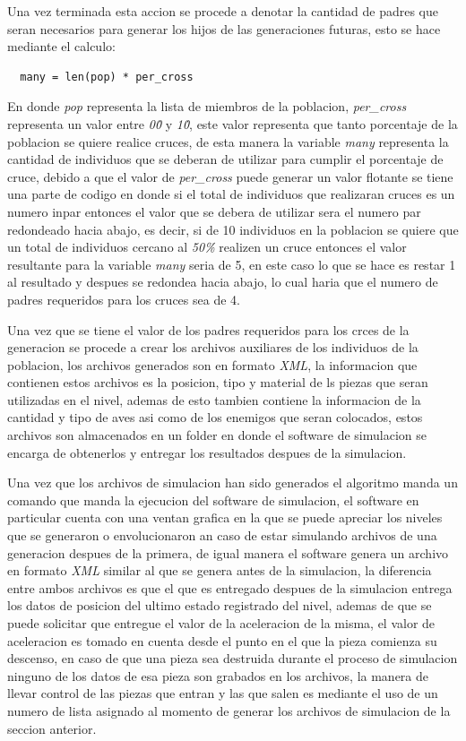 Una vez terminada esta accion se procede a denotar la cantidad de padres que
seran necesarios para generar los hijos de las generaciones futuras, esto se
hace mediante el calculo:
\begin{verbatim}
  many = len(pop) * per_cross
\end{verbatim}
En donde \textit{pop} representa la lista de miembros de la poblacion,
\textit{per\_cross} representa un valor entre \textit{0\.0} y \textit{1\.0}, este
valor representa que tanto porcentaje de la poblacion se quiere realice cruces,
de esta manera la variable \textit{many} representa la cantidad de individuos
que se deberan de utilizar para cumplir el porcentaje de cruce, debido a que el
valor de \textit{per\_cross} puede generar un valor flotante se tiene una parte
de codigo en donde si el total de individuos que realizaran cruces es un numero
inpar entonces el valor que se debera de utilizar sera el numero par redondeado
hacia abajo, es decir, si de 10 individuos en la poblacion se quiere que un
total de individuos cercano al \textit{50\%} realizen un cruce entonces el valor
resultante para la variable \textit{many} seria de 5, en este caso lo que se
hace es restar 1 al resultado y despues se redondea hacia abajo, lo cual haria
que el numero de padres requeridos para los cruces sea de 4.

Una vez que se tiene el valor de los padres requeridos para los crces de la
generacion se procede a crear los archivos auxiliares de los individuos de la
poblacion, los archivos generados son en formato \textit{XML}, la informacion
que contienen estos archivos es la posicion, tipo y material de ls piezas que
seran utilizadas en el nivel, ademas de esto tambien contiene la informacion de
la cantidad y tipo de aves asi como de los enemigos que seran colocados, estos
archivos son almacenados en un folder en donde el software de simulacion se
encarga de obtenerlos y entregar los resultados despues de la simulacion.

Una vez que los archivos de simulacion han sido generados el algoritmo manda un
comando que manda la ejecucion del software de simulacion, el software en
particular cuenta con una ventan grafica en la que se puede apreciar los niveles
que se generaron o envolucionaron an caso de estar simulando archivos de una
generacion despues de la primera, de igual manera el software genera un archivo
en formato \textit{XML} similar al que se genera antes de la simulacion, la
diferencia entre ambos archivos es que el que es entregado despues de la
simulacion entrega los datos de posicion del ultimo estado registrado del nivel,
ademas de que se puede solicitar que entregue el valor de la aceleracion de la
misma, el valor de aceleracion es tomado en cuenta desde el punto en el que la
pieza comienza su descenso, en caso de que una pieza sea destruida durante el
proceso de simulacion ninguno de los datos de esa pieza son grabados en los
archivos, la manera de llevar control de las piezas que entran y las que salen
es mediante el uso de un numero de lista asignado al momento de generar los
archivos de simulacion de la seccion anterior.

